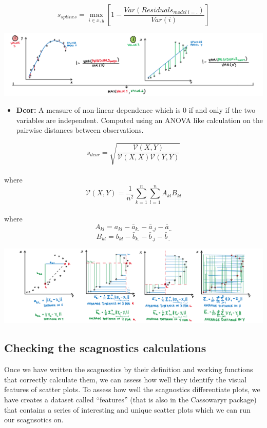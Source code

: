 \[s_{splines}=\max_{i\in x,y}[1-\frac{Var(Residuals_{model~i=.})}{Var(i)}]\]

\includegraphics{figures/drawsplines.png}

\begin{itemize}
\tightlist
\item
  \textbf{Dcor:} A measure of non-linear dependence which is 0 if and
  only if the two variables are independent. Computed using an ANOVA
  like calculation on the pairwise distances between observations.
\end{itemize}

\[s_{dcor}= \sqrt{\frac{\mathcal{V}(X,Y)}{\mathcal{V}(X,X)\mathcal{V}(Y,Y)}}\]\\
where \[\mathcal{V}
(X,Y)=\frac{1}{n^2}\sum_{k=1}^n\sum_{l=1}^nA_{kl}B_{kl}\]\\
where \[A_{kl}=a_{kl}-\bar{a}_{k.}-\bar{a}_{.j}-\bar{a}_{..}\]
\[B_{kl}=b_{kl}-\bar{b}_{k.}-\bar{b}_{.j}-\bar{b}_{..}\]

\includegraphics{figures/drawdcor.png}

\hypertarget{checking-the-scagnostics-calculations}{%
\subsection{Checking the scagnostics
calculations}\label{checking-the-scagnostics-calculations}}

Once we have written the scagnsotics by their definition and working
functions that correctly calculate them, we can assess how well they
identify the visual features of scatter plots. To assess how well the
scagnostics differentiate plots, we have creates a dataset called
``features'' (that is also in the Cassowaryr package) that contains a
series of interesting and unique scatter plots which we can run our
scagnsotics on.

